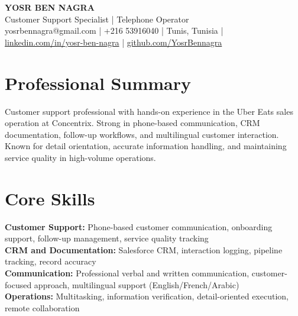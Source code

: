 \documentclass[10pt,a4paper]{article}
\begin{document}
\begin{center}
  {\Large\bfseries YOSR BEN NAGRA}\\[2pt]
  {\small Customer Support Specialist | Telephone Operator}\\[3pt]
  {\footnotesize yosrbennagra@gmail.com \;|\; +216 53916040 \;|\; Tunis, Tunisia \;|\; \href{https://www.linkedin.com/in/yosr-ben-nagra/}{linkedin.com/in/yosr-ben-nagra} \;|\; \href{https://github.com/YosrBennagra}{github.com/YosrBennagra}}
\end{center}

\section*{Professional Summary}
{\small
Customer support professional with hands-on experience in the Uber Eats sales operation at Concentrix. Strong in phone-based communication, CRM documentation, follow-up workflows, and multilingual customer interaction. Known for detail orientation, accurate information handling, and maintaining service quality in high-volume operations.
}

\vspace{4pt}

\section*{Core Skills}
{\small
\textbf{Customer Support:} Phone-based customer communication, onboarding support, follow-up management, service quality tracking\\[2pt]
\textbf{CRM and Documentation:} Salesforce CRM, interaction logging, pipeline tracking, record accuracy\\[2pt]
\textbf{Communication:} Professional verbal and written communication, customer-focused approach, multilingual support (English/French/Arabic)\\[2pt]
\textbf{Operations:} Multitasking, information verification, detail-oriented execution, remote collaboration
}

\vspace{6pt}
\end{document}
